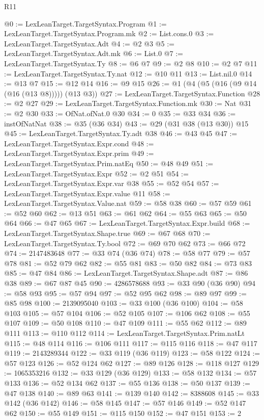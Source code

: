 \begin{lexlean}{R11}
\begin{coremodule}
@0 := LexLeanTarget.TargetSyntax.Program
@1 := LexLeanTarget.TargetSyntax.Program.mk
@2 := List.cons.{0}
@3 := LexLeanTarget.TargetSyntax.Adt
@4 := @2 @3
@5 := LexLeanTarget.TargetSyntax.Adt.mk
@6 := List.{0}
@7 := LexLeanTarget.TargetSyntax.Ty
@8 := @6 @7
@9 := @2 @8
@10 := @2 @7
@11 := LexLeanTarget.TargetSyntax.Ty.nat
@12 := @10 @11
@13 := List.nil.{0}
@14 := @13 @7
@15 := @12 @14
@16 := @9 @15
@26 := @1 (@4 (@5 (@16 (@9 @14 (@16 (@13 @8))))) (@13 @3))
@27 := LexLeanTarget.TargetSyntax.Function
@28 := @2 @27
@29 := LexLeanTarget.TargetSyntax.Function.mk
@30 := Nat
@31 := @2 @30
@33 := OfNat.ofNat.{0} @30
@34 := 0
@35 := @33 @34
@36 := instOfNatNat
@38 := @35 (@36 @34)
@43 := @29 (@31 @38 (@13 @30)) @15
@45 := LexLeanTarget.TargetSyntax.Ty.adt @38
@46 := @43 @45
@47 := LexLeanTarget.TargetSyntax.Expr.cond
@48 := LexLeanTarget.TargetSyntax.Expr.prim
@49 := LexLeanTarget.TargetSyntax.Prim.natEq
@50 := @48 @49
@51 := LexLeanTarget.TargetSyntax.Expr
@52 := @2 @51
@54 := LexLeanTarget.TargetSyntax.Expr.var @38
@55 := @52 @54
@57 := LexLeanTarget.TargetSyntax.Expr.value @11
@58 := LexLeanTarget.TargetSyntax.Value.nat
@59 := @58 @38
@60 := @57 @59
@61 := @52 @60
@62 := @13 @51
@63 := @61 @62
@64 := @55 @63
@65 := @50 @64
@66 := @47 @65
@67 := LexLeanTarget.TargetSyntax.Expr.build
@68 := LexLeanTarget.TargetSyntax.Shape.true
@69 := @67 @68
@70 := LexLeanTarget.TargetSyntax.Ty.bool
@72 := @69 @70 @62
@73 := @66 @72
@74 := 2147483648
@77 := @33 @74 (@36 @74)
@78 := @58 @77
@79 := @57 @78
@81 := @52 @79 @62
@82 := @55 @81
@83 := @50 @82
@84 := @73 @83
@85 := @47 @84
@86 := LexLeanTarget.TargetSyntax.Shape.adt
@87 := @86 @38
@89 := @67 @87 @45
@90 := 4286578688
@93 := @33 @90 (@36 @90)
@94 := @58 @93
@95 := @57 @94
@97 := @52 @95 @62
@98 := @89 @97
@99 := @85 @98
@100 := 2139095040
@103 := @33 @100 (@36 @100)
@104 := @58 @103
@105 := @57 @104
@106 := @52 @105
@107 := @106 @62
@108 := @55 @107
@109 := @50 @108
@110 := @47 @109
@111 := @55 @62
@112 := @89 @111
@113 := @110 @112
@114 := LexLeanTarget.TargetSyntax.Prim.natLt
@115 := @48 @114
@116 := @106 @111
@117 := @115 @116
@118 := @47 @117
@119 := 2143289344
@122 := @33 @119 (@36 @119)
@123 := @58 @122
@124 := @57 @123
@126 := @52 @124 @62
@127 := @89 @126
@128 := @118 @127
@129 := 1065353216
@132 := @33 @129 (@36 @129)
@133 := @58 @132
@134 := @57 @133
@136 := @52 @134 @62
@137 := @55 @136
@138 := @50 @137
@139 := @47 @138
@140 := @89 @63
@141 := @139 @140
@142 := 8388608
@145 := @33 @142 (@36 @142)
@146 := @58 @145
@147 := @57 @146
@149 := @52 @147 @62
@150 := @55 @149
@151 := @115 @150
@152 := @47 @151
@153 := 2

\end{coremodule}
\end{lexlean}
